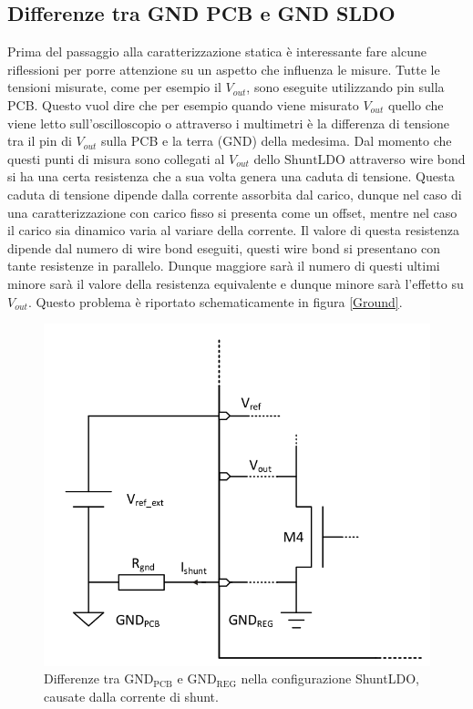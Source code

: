 \subsection{Differenze tra GND PCB e GND SLDO}
Prima del passaggio alla caratterizzazione statica è interessante fare alcune riflessioni per porre attenzione su un aspetto che influenza le misure. 
Tutte le tensioni misurate, come per esempio il $V_{out}$, sono eseguite utilizzando pin sulla PCB. Questo vuol dire che per esempio quando viene misurato $V_{out}$ quello che viene letto sull'oscilloscopio o attraverso i multimetri è la differenza di tensione tra il pin di $V_{out}$ sulla PCB e la terra (GND) della medesima. Dal momento che questi punti di misura sono collegati al $V_{out}$ dello $\mathrm{ShuntLDO}$ attraverso wire bond si ha una certa resistenza che a sua volta genera una caduta di tensione. Questa caduta di tensione dipende dalla corrente assorbita dal carico, dunque nel caso di una caratterizzazione con carico fisso si presenta come un offset, mentre nel caso il carico sia dinamico varia al variare della corrente. 
Il valore di questa resistenza dipende dal numero di wire bond eseguiti, questi wire bond si presentano con tante resistenze in parallelo. Dunque maggiore sarà il numero di questi ultimi minore sarà il valore della resistenza equivalente e dunque minore sarà l'effetto su $V_{out}$. Questo problema è riportato schematicamente in figura \ref{Ground}.

\begin{figure}
\centering
\includegraphics[scale=.3]{Immagini/Ground}
\caption{Differenze tra $\mathrm{GND_{PCB}}$ e $\mathrm{GND_{REG}}$ nella configurazione ShuntLDO, causate dalla corrente di shunt.}
\label{SLDO2Astatic}
\end{figure}

